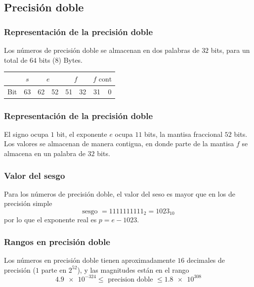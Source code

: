 \subsection{Precisión doble}
\begin{frame}
\frametitle{Representación de la precisión doble}
Los números de precisión doble se almacenan en dos palabras de $32$ bits, para un total de $64$ bits ($8$) Bytes.
\pause
\begin{table}
\fontsize{12}{12}\selectfont
\begin{tabular}{ l | c | c | c | c | c | c | c |}
\cline{2-8}
 {} & $s$ & \multicolumn{2}{c|}{$e$} & \multicolumn{2}{c|}{$f$} & \multicolumn{2}{c|}{$f \text{ cont}$} \\ \hline
 Bit & 63 & 62 & 52 & 51 & 32 & 31 & 0 \\ \hline
\end{tabular}
\end{table}
\end{frame}
\begin{frame}
\frametitle{Representación de la precisión doble}
El signo ocupa $1$ bit, el exponente $e$ ocupa $11$ bits, la mantisa fraccional $52$ bits.
\\
\bigskip
Los valores se almacenan de manera contigua, en donde parte de la mantisa $f$ se almacena en un palabra de $32$ bits.
\end{frame}
\begin{frame}
\frametitle{Valor del sesgo}
Para los números de precisión doble, el valor del seso es mayor que en los de precisión simple
\[ \text{sesgo } = 1111111111_{2} = 1023_{10} \]
por lo que el exponente real es $p = e - 1023$.
\end{frame}
\begin{frame}
\frametitle{Rangos en precisión doble}
Los números en precisión doble tienen aproximadamente $16$ decimales de precisión ($1$ parte en $2^{52}$), y las magnitudes están en el rango
\[ \num{4.9e-324} \leq \text{ precision doble } \leq \num{1.8e308} \]
\end{frame}
